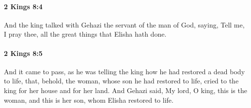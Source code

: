 		\paragraph{2 Kings 8:4} %
			\label{2KINGS-8-4}

			And the king talked with Gehazi the servant of the man of God, saying, Tell me, I pray thee, all the great things that Elisha hath done.


		\paragraph{2 Kings 8:5} %
			\label{2KINGS-8-5}

			And it came to pass, as he was telling the king how he had restored a dead body to life, that, behold, the woman, whose son he had restored to life, cried to the king for her house and for her land. And Gehazi said, My lord, O king, this is the woman, and this is her son, whom Elisha restored to life.

